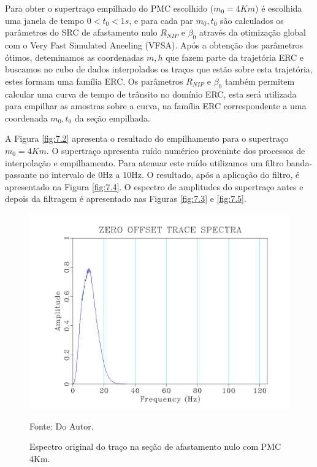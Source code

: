 Para obter o supertraço empilhado do PMC escolhido ($m_0=4Km$) é escolhida uma janela de tempo $0<t_0<1s$, 
e para cada par $m_0,t_0$
são calculados os parâmetros do SRC de afastamento nulo $R_{NIP}$ e $\beta_0$ através da otimização global com o Very Fast
Simulated Aneeling (VFSA). Após a obtenção dos parâmetros ótimos, deteminamos as coordenadas $m,h$ que fazem parte da trajetória ERC
e buscamos no cubo de dados interpolados os traços que estão sobre esta trajetória, estes formam uma família ERC.
Os parâmetros $R_{NIP}$ e $\beta_0$ também permitem calcular uma curva de tempo de trânsito no domínio ERC, esta será utilizada
para empilhar as amostras sobre a curva, na família ERC correspondente a uma coordenada $m_0, t_0$ da seção empilhada.

A Figura \ref{fig:7.2} apresenta o resultado do empilhamento para o supertraço $m_0=4Km$. O supertraço apresenta ruído numérico
proveninte dos processos de interpolação e empilhamento. Para atenuar este ruído utilizamos um filtro banda-passante no 
intervalo de 0Hz a 10Hz. O resultado, após a aplicação do filtro, é apresentado na Figura \ref{fig:7.4}. O espectro de amplitudes
do supertraço antes e depois da filtragem é apresentado nas Figuras \ref{fig:7.3} e \ref{fig:7.5}.

\begin{figure}
\caption{Espectro original do traço na seção de afastamento nulo com PMC 4Km.}
\begin{center}
\includegraphics[scale=0.4]{images/originalTraceSpectra.jpeg}
\vspace{-0.3cm}
\end{center}
\begin{center}
 Fonte: Do Autor.
\end{center}
\label{fig:7.1}
\end{figure}


